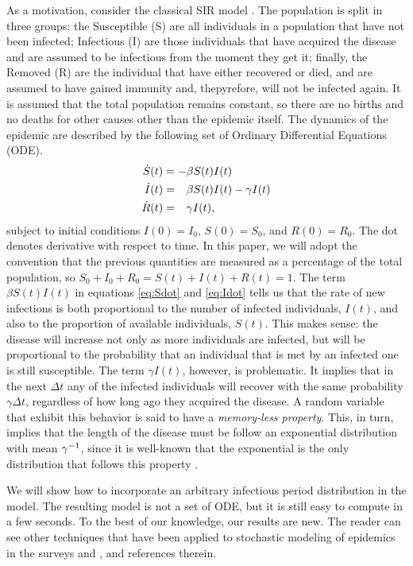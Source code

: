 \documentclass[USenglish,10pt]{article}
\newcommand{\gami}{\ensuremath\gamma^{-1}\xspace}
\newcommand{\phm}{\ensuremath\phantom{-}\xspace}
\begin{document}
As a motivation, consider the classical SIR model \cite{kerm.mcke27,murr07,chas09}. The population is split in three groups: the Susceptible (S) are all individuals in a population that have not been infected; Infectious (I) are those individuals that have acquired the disease and are assumed to be infectious from the moment they get it; finally, the Removed (R) are the individual that have either recovered or died, and are assumed to have gained immunity and, thepyrefore, will not be infected again. It is assumed that the total population remains constant, so there are no births and no deaths for other causes other than the epidemic itself.
The dynamics of the epidemic are described by the following set of Ordinary Differential Equations (ODE).
\begin{subequations}
	\begin{align}
		\dot{S}(t) &= -\beta S(t)I(t)  \label{eq:Sdot} \\
		\dot{I}(t) &= \phm\beta S(t)I(t) - \gamma I(t) \label{eq:Idot}  \\
		\dot{R}(t) &= \phm\gamma I(t), \label{eq:Rdot}
	\end{align}
\end{subequations}
subject to initial conditions $I(0)=I_0$, $S(0)=S_0$, and $R(0)=R_0$. The dot denotes derivative with respect to time. In this paper, we will adopt the convention that the previous quantities are measured as a percentage of the total population, so $S_0+I_0+R_0=S(t)+I(t)+R(t)=1$.
The term $\beta S(t)I(t)$ in equations \eqref{eq:Sdot} and \eqref{eq:Idot} tells us that the rate of new infections is both proportional to the number of infected individuals, $I(t)$, and also to the proportion of available individuals, $S(t)$.
This makes sense: the disease will increase not only as more individuals are infected, but will be proportional to the probability that an individual that is met by an infected one is still susceptible.
The term $\gamma I(t)$, however, is problematic. It implies that in the next $\Delta t$ any of the infected individuals will recover with the same probability $\gamma \Delta t$, regardless of how long ago they acquired the disease.
A random variable that exhibit this behavior is said to have a \emph{memory-less property}.
This, in turn, implies that the length of the disease must be follow an exponential distribution with mean $\gami$, since it is well-known that the exponential is the only distribution that follows this property \cite{kulk95}.

We will show how to incorporate an arbitrary infectious period distribution in the model.
The resulting model is not a set of ODE, but it is still easy to compute in a few seconds.
To the best of our knowledge, our results are new.
The reader can see other techniques that have been applied to stochastic modeling of epidemics in the surveys \cite{lefe90} and \cite{dale.gani01}, and references therein.
\end{document}
